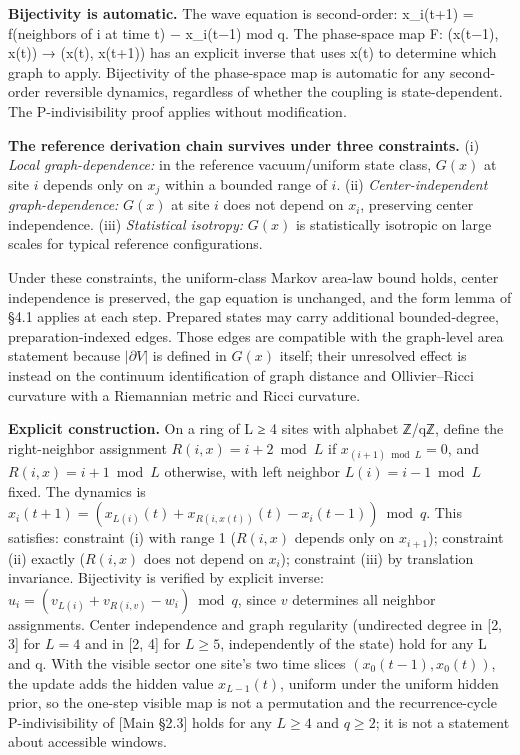 \documentclass[
]{article}
\begin{document}
\textbf{Bijectivity is automatic.} The wave equation is second-order:
x\_i(t+1) = f(neighbors of i at time t) − x\_i(t−1) mod q. The
phase-space map F: (x(t−1), x(t)) → (x(t), x(t+1)) has an explicit
inverse that uses x(t) to determine which graph to apply. Bijectivity of
the phase-space map is automatic for any second-order reversible
dynamics, regardless of whether the coupling is state-dependent. The
P-indivisibility proof applies without modification.

\textbf{The reference derivation chain survives under three
constraints.} (i) \emph{Local graph-dependence:} in the reference
vacuum/uniform state class, \(G(x)\) at site \(i\) depends only on
\(x_j\) within a bounded range of \(i\). (ii) \emph{Center-independent
graph-dependence:} \(G(x)\) at site \(i\) does not depend on \(x_i\),
preserving center independence. (iii) \emph{Statistical isotropy:}
\(G(x)\) is statistically isotropic on large scales for typical
reference configurations.

Under these constraints, the uniform-class Markov area-law bound holds,
center independence is preserved, the gap equation is unchanged, and the
form lemma of §4.1 applies at each step. Prepared states may carry
additional bounded-degree, preparation-indexed edges. Those edges are
compatible with the graph-level area statement because \(|\partial V|\)
is defined in \(G(x)\) itself; their unresolved effect is instead on the
continuum identification of graph distance and Ollivier--Ricci curvature
with a Riemannian metric and Ricci curvature.

\textbf{Explicit construction.} On a ring of L ≥ 4 sites with alphabet
ℤ/qℤ, define the right-neighbor assignment \(R(i, x) = i+2 \bmod L\) if
\(x_{(i+1) \bmod L} = 0\), and \(R(i, x) = i+1 \bmod L\) otherwise, with
left neighbor \(L(i) = i - 1 \bmod L\) fixed. The dynamics is
\(x_i(t+1) = (x_{L(i)}(t) + x_{R(i,x(t))}(t) - x_i(t-1)) \bmod q\). This
satisfies: constraint (i) with range 1 (\(R(i,x)\) depends only on
\(x_{i+1}\)); constraint (ii) exactly (\(R(i,x)\) does not depend on
\(x_i\)); constraint (iii) by translation invariance. Bijectivity is
verified by explicit inverse:
\(u_i = (v_{L(i)} + v_{R(i,v)} - w_i) \bmod q\), since \(v\) determines
all neighbor assignments. Center independence and graph regularity
(undirected degree in {[}2, 3{]} for \(L=4\) and in {[}2, 4{]} for
\(L \geq 5\), independently of the state) hold for any L and q. With the
visible sector one site's two time slices \((x_0(t-1), x_0(t))\), the
update adds the hidden value \(x_{L-1}(t)\), uniform under the uniform
hidden prior, so the one-step visible map is not a permutation and the
recurrence-cycle P-indivisibility of {[}Main §2.3{]} holds for any
\(L \geq 4\) and \(q \geq 2\); it is not a statement about accessible
windows.
\end{document}
